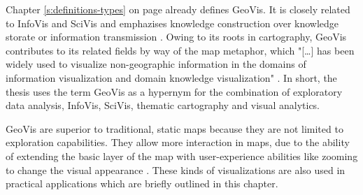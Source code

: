 Chapter \ref{s:definitions-types} on page \pageref{s:definitions-types} already defines \ac{GeoVis}. It is closely related to \ac{InfoVis} and \ac{SciVis} and emphazises knowledge construction over knowledge storate or information transmission . Owing to its roots in cartography, \ac{GeoVis} contributes to its related fields by way of the map metaphor, which "[\ldots] has been widely used to visualize non-geographic information in the domains of information visualization and domain knowledge visualization" .
In short, the thesis uses the term \ac{GeoVis} as a hypernym for the combination of exploratory data analysis, \ac{InfoVis}, \ac{SciVis}, thematic cartography and visual analytics.

\ac{GeoVis} are superior to traditional, static maps because they are not limited to exploration capabilities. They allow more interaction in maps, due to the ability of extending the basic layer of the map with user-experience abilities like zooming to change the visual appearance . These kinds of visualizations are also used in practical applications which are briefly outlined in this chapter.


